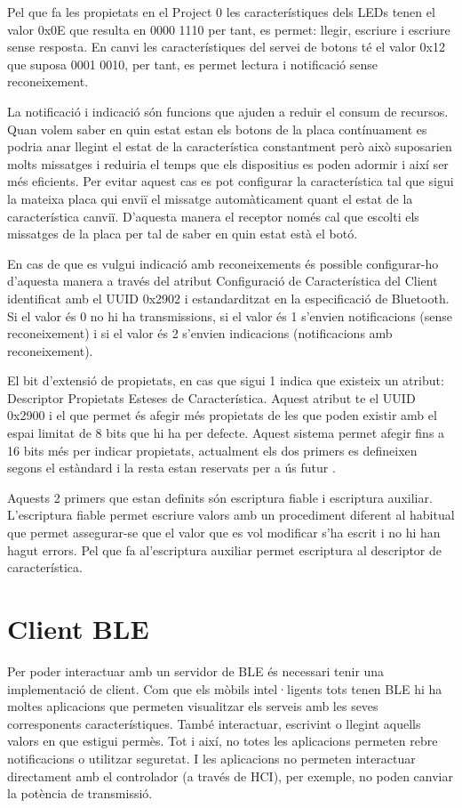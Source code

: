 Pel que fa les propietats en el Project 0 les característiques dels LEDs tenen el valor 0x0E que resulta en 0000 1110 per tant, es permet: llegir, escriure i escriure sense resposta.
En canvi les característiques del servei de botons té el valor 0x12 que suposa 0001 0010, per tant, es permet lectura i notificació sense reconeixement.

La notificació i indicació són funcions que ajuden a reduir el consum de recursos.
Quan volem saber en quin estat estan els botons de la placa contínuament es podria anar llegint el estat de la característica constantment però això suposarien molts missatges i reduiria el temps que els dispositius es poden adormir i així ser més eficients.
Per evitar aquest cas es pot configurar la característica tal que sigui la mateixa placa qui enviï el missatge automàticament quant el estat de la característica canviï.
D'aquesta manera el receptor només cal que escolti els missatges de la placa per tal de saber en quin estat està el botó.

En cas de que es vulgui indicació amb reconeixements és possible configurar-ho d'aquesta manera a través del atribut Configuració de Característica del Client identificat amb el UUID 0x2902 i estandarditzat en la especificació de Bluetooth.
Si el valor és 0 no hi ha transmissions, si el valor és 1 s'envien notificacions (sense reconeixement) i si el valor és 2 s'envien indicacions (notificacions amb reconeixement). 

El bit d'extensió de propietats, en cas que sigui 1 indica que existeix un atribut: Descriptor Propietats Esteses de Característica.
Aquest atribut te el UUID 0x2900 i el que permet és afegir més propietats de les que poden existir amb el espai limitat de 8 bits que hi ha per defecte.
Aquest sistema permet afegir fins a 16 bits més per indicar propietats, actualment els dos primers es defineixen segons el estàndard i la resta estan reservats per a ús futur \cite{extended properties}.

Aquests 2 primers que estan definits són escriptura fiable i escriptura auxiliar.
L'escriptura fiable permet escriure valors amb un procediment diferent al habitual que permet assegurar-se que el valor que es vol modificar s'ha escrit i no hi han hagut errors.
Pel que fa  al'escriptura auxiliar permet escriptura al descriptor de característica. %



\section{Client BLE}
Per poder interactuar amb un servidor de BLE és necessari tenir una implementació de client.
Com que els mòbils intel·ligents tots tenen BLE hi ha moltes aplicacions que permeten visualitzar els serveis amb les seves corresponents característiques.
També interactuar, escrivint o llegint aquells valors en que estigui permès.
Tot i així, no totes les aplicacions permeten rebre notificacions o utilitzar seguretat.
I les aplicacions no permeten interactuar directament amb el controlador (a través de HCI), per exemple, no poden canviar la potència de transmissió. 

